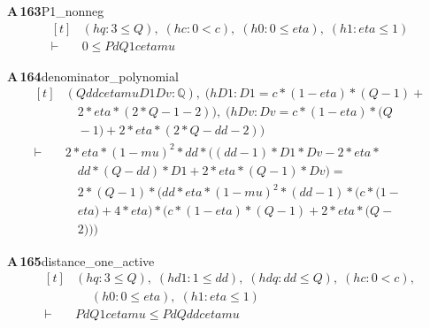 \documentclass[conference]{IEEEtran}
\theoremstyle{definition}
\newcommand{\lean}[1]{\textsf{\footnotesize #1}}
\begin{document}
\noindent\textbf{A\,163}\quad\lean{P1\_nonneg}
{\footnotesize\[ \begin{aligned}[t]
&(\mathit{hq} : 3 \leq \mathit{Q}),\; (\mathit{hc} : 0 < \mathit{c}),\; (\mathit{h0} : 0 \leq \mathit{eta}),\; (\mathit{h1} : \mathit{eta} \leq 1)\\
\vdash\;&0 \leq \mathit{Pd} \mathit{Q} 1 \mathit{c} \mathit{eta} \mathit{mu}
\end{aligned} \]}

\noindent\textbf{A\,164}\quad\lean{denominator\_polynomial}
{\footnotesize\[ \begin{aligned}[t]
&(\mathit{Q} \mathit{dd} \mathit{c} \mathit{eta} \mathit{mu} \mathit{D1} \mathit{Dv} : \mathbb{Q} ),\; (\mathit{hD1} : \mathit{D1} = \mathit{c} * (1 - \mathit{eta}) * (\mathit{Q} - 1) +\\
&\quad 2 * \mathit{eta} * (2 * \mathit{Q} - 1 - 2)),\; (\mathit{hDv} : \mathit{Dv} = \mathit{c} * (1 - \mathit{eta}) * (\mathit{Q}\\
&\quad - 1) + 2 * \mathit{eta} * (2 * \mathit{Q} - \mathit{dd} - 2))\\
\vdash\;&2 * \mathit{eta} * (1 - \mathit{mu}) ^{2} * \mathit{dd} * ((\mathit{dd} - 1) * \mathit{D1} * \mathit{Dv} - 2 * \mathit{eta} *\\
&\quad \mathit{dd} * (\mathit{Q} - \mathit{dd}) * \mathit{D1} + 2 * \mathit{eta} * (\mathit{Q} - 1) * \mathit{Dv}) =\\
&\quad 2 * (\mathit{Q} - 1) * (\mathit{dd} * \mathit{eta} * (1 - \mathit{mu}) ^{2} * (\mathit{dd} - 1) * (\mathit{c} * (1 -\\
&\quad \mathit{eta}) + 4 * \mathit{eta}) * (\mathit{c} * (1 - \mathit{eta}) * (\mathit{Q} - 1) + 2 * \mathit{eta} * (\mathit{Q} -\\
&\quad 2)))
\end{aligned} \]}

\noindent\textbf{A\,165}\quad\lean{distance\_one\_active}
{\footnotesize\[ \begin{aligned}[t]
&(\mathit{hq} : 3 \leq \mathit{Q}),\; (\mathit{hd1} : 1 \leq \mathit{dd}),\; (\mathit{hdq} : \mathit{dd} \leq \mathit{Q}),\; (\mathit{hc} : 0 < \mathit{c}),\\
&\quad \; (\mathit{h0} : 0 \leq \mathit{eta}),\; (\mathit{h1} : \mathit{eta} \leq 1)\\
\vdash\;&\mathit{Pd} \mathit{Q} 1 \mathit{c} \mathit{eta} \mathit{mu} \leq \mathit{Pd} \mathit{Q} \mathit{dd} \mathit{c} \mathit{eta} \mathit{mu}
\end{aligned} \]}
\end{document}
